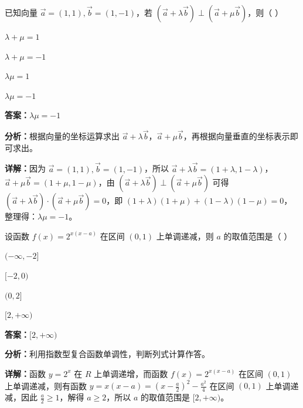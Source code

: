 \begin{question}[points=5]
已知向量 $\vec{a}=(1,1),\vec{b}=(1,-1)$，若 $(\vec{a}+\lambda\vec{b})\perp(\vec{a}+\mu\vec{b})$，则（ ）
\begin{choices}
  \item $\lambda+\mu=1$
  \item $\lambda+\mu=-1$
  \item $\lambda\mu=1$
  \item $\lambda\mu=-1$
\end{choices}
\begin{solution}
\textbf{答案：}$\lambda\mu=-1$

\textbf{分析：}根据向量的坐标运算求出 $\vec{a}+\lambda\vec{b}$，$\vec{a}+\mu\vec{b}$，再根据向量垂直的坐标表示即可求出。

\textbf{详解：}因为 $\vec{a}=(1,1),\vec{b}=(1,-1)$，所以 $\vec{a}+\lambda\vec{b}=(1+\lambda,1-\lambda)$，$\vec{a}+\mu\vec{b}=(1+\mu,1-\mu)$，由 $(\vec{a}+\lambda\vec{b})\perp(\vec{a}+\mu\vec{b})$ 可得 $(\vec{a}+\lambda\vec{b})\cdot(\vec{a}+\mu\vec{b})=0$，即 $(1+\lambda)(1+\mu)+(1-\lambda)(1-\mu)=0$，整理得：$\lambda\mu=-1$。
\end{solution}
\end{question}

\begin{question}[points=5]
设函数 $f(x)=2^{x(x-a)}$ 在区间 $(0,1)$ 上单调递减，则 $a$ 的取值范围是（ ）
\begin{choices}
  \item $(-\infty,-2]$
  \item $[-2,0)$
  \item $(0,2]$
  \item $[2,+\infty)$
\end{choices}
\begin{solution}
\textbf{答案：}$[2,+\infty)$

\textbf{分析：}利用指数型复合函数单调性，判断列式计算作答。

\textbf{详解：}函数 $y=2^x$ 在 $R$ 上单调递增，而函数 $f(x)=2^{x(x-a)}$ 在区间 $(0,1)$ 上单调递减，则有函数 $y=x(x-a)=(x-\frac{a}{2})^2-\frac{a^2}{4}$ 在区间 $(0,1)$ 上单调递减，因此 $\frac{a}{2}\geq 1$，解得 $a\geq 2$，所以 $a$ 的取值范围是 $[2,+\infty)$。
\end{solution}
\end{question}

